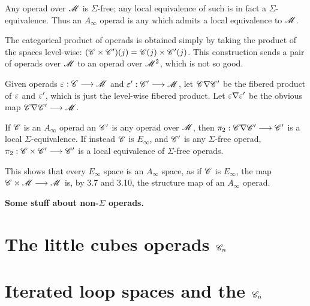 \documentclass[11pt]{article}
\begin{document}
\begin{lem*}[3.7]
Any operad over $\mathscr{M}$ is $\Sigma$-free; any local equivalence of such is
in fact a $\Sigma$-equivalence.
Thus an $A_\infty$ operad is any which admits a local equivalence to $\mathscr{M}$.
\end{lem*}
The categorical product of operads is obtained simply by taking the product
of the spaces level-wise: $(\mathscr{C}\times\mathscr{C}')(j)=\mathscr{C}(j)\times\mathscr{C}'(j)$.
This construction sends a pair of operads over $\mathscr{M}$ to an operad over
$\mathscr{M}^2$, which is not so good.
\begin{defn*}[3.9]
Given operads $\varepsilon:\mathscr{C}\longrightarrow\mathscr{M}$ and $\varepsilon':\mathscr{C}'\longrightarrow\mathscr{M}$, let 
$\mathscr{C}\nabla\mathscr{C}'$ be the fibered product of $\varepsilon$ and $\varepsilon'$, which is
just the level-wise fibered product. Let $\varepsilon\nabla\varepsilon'$ be the obvious
map $\mathscr{C}\nabla\mathscr{C}'\longrightarrow\mathscr{M}$.
\end{defn*}
\begin{prop*}[3.10]
If $\mathscr{C}$ is an $A_\infty$ operad an $\mathscr{C}'$ is any operad over $\mathscr{M}$, then
$\pi_2:\mathscr{C}\nabla\mathscr{C}'\longrightarrow\mathscr{C}'$ is a local $\Sigma$-equivalence. If instead
$\mathscr{C}$ is $E_\infty$, and $\mathscr{C}'$ is any $\Sigma$-free operad,
$\pi_2:\mathscr{C}\times\mathscr{C}'\longrightarrow\mathscr{C}'$ is a local equivalence of $\Sigma$-free
operads.
\end{prop*}\noindent
This shows that every $E_\infty$ space is an $A_\infty$ space, as if $\mathscr{C}$
is $E_\infty$, the map $\mathscr{C}\times\mathscr{M}\longrightarrow\mathscr{M}$ is, by 3.7 and 3.10,
the structure map of an $A_\infty$ operad. 

\noindent\textbf{Some stuff about non-$\Sigma$ operads.}
\section{The little cubes operads \texorpdfstring{$\mathscr{C}_n$}{Cn}}
\section{Iterated loop spaces and the \texorpdfstring{$\mathscr{C}_n$}{Cn}}

\setcounter{section}{8}
\end{document}

